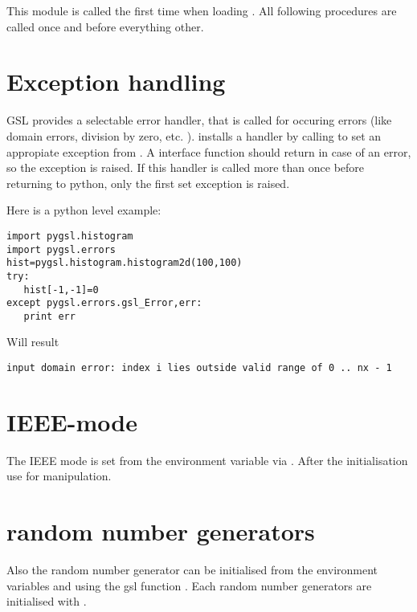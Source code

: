 
This module is called the first time when loading .
All following procedures are called once and before everything other.

\section{Exception handling}
 GSL provides a selectable error
handler, that is called for occuring errors (like domain errors, division by
zero, etc. ).   installs a handler by calling
 to set an appropiate exception from
.  A  interface function should return
 in case of an error, so the exception is raised.  If this handler
is called more than once before returning to python, only the first set
exception is raised.

Here is a python level example:
\begin{verbatim}
import pygsl.histogram
import pygsl.errors
hist=pygsl.histogram.histogram2d(100,100)
try:
   hist[-1,-1]=0
except pygsl.errors.gsl_Error,err:
   print err
\end{verbatim}
Will result
\begin{verbatim}
input domain error: index i lies outside valid range of 0 .. nx - 1
\end{verbatim}

\section{IEEE-mode}
The IEEE mode is set from the environment variable  via .
After the initialisation use  for manipulation.

\section{random number generators}
Also the random number generator can be initialised from the environment variables 
and  using the gsl function .
Each random number generators are initialised with .


